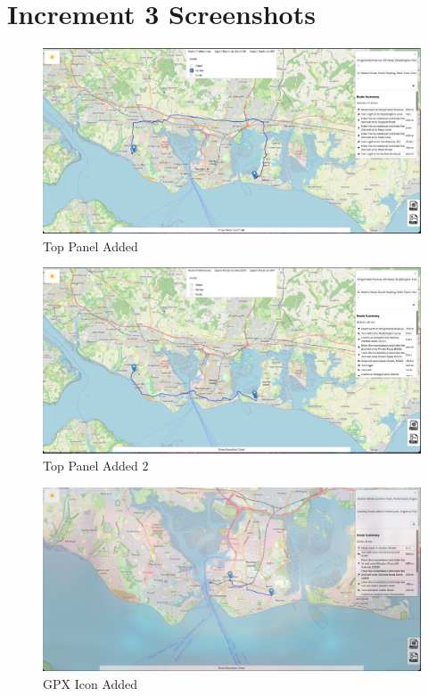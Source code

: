 \chapter{Increment 3 Screenshots}

\begin{figure}[!ht]
    \centering
    \includegraphics[width=425px]{figures/Progress Images/Iteration-1/SR7/SR9 Top Panel added and Avoid functionality implemented Avoid Ferries Example.png}
    \caption{Top Panel Added}
\end{figure}

\begin{figure}[!ht]
    \centering
    \includegraphics[width=425px]{figures/Progress Images/Iteration-1/SR7/SR9 Top Panel added and Avoid functionality implemented.png}
    \caption{Top Panel Added 2}
\end{figure}

\begin{figure}[!ht]
    \centering
    \includegraphics[width=425px]{figures/Progress Images/Iteration-1/SR12/SR13 GPX Icon Added (bottom right).png}
    \caption{GPX Icon Added}
\end{figure}

